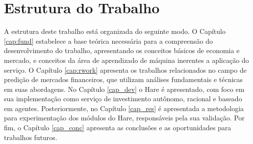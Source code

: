 \section{Estrutura do Trabalho}

A estrutura deste trabalho está organizada do seguinte modo. O Capítulo \ref{cap:fund} estabelece a base teórica necessária para a compreensão do desenvolvimento do trabalho, apresentando os conceitos básicos de economia e mercado, e conceitos da área de aprendizado de máquina inerentes a aplicação do serviço. O Capítulo \ref{cap:rwork} apresenta os trabalhos relacionados no campo de predição de mercados financeiros, que utilizam análises fundamentais e técnicas em suas abordagens. No Capítulo \ref{cap_dev} o Hare é apresentado, com foco em sua implementação como serviço de investimento autônomo, racional e baseado em agentes. Posteriormente, no Capítulo \ref{cap_res} é apresentada a metodologia para experimentação dos módulos do Hare, responsáveis pela sua validação. Por fim, o Capítulo \ref{cap_conc} apresenta as conclusões e as oportunidades para trabalhos futuros.

